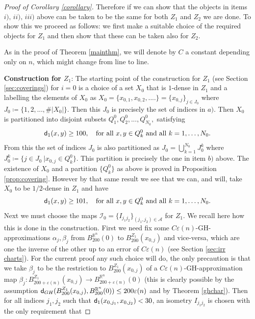 \documentclass[11pt]{article}
\newcommand{\eps}{\varepsilon}
\newcommand{\rr}{\mathbb{R}}
\newcommand{\sfd}{{\sf d}}
\theoremstyle{plain}
\theoremstyle{definition}
\numberwithin{equation}{section}
\begin{document}
\begin{proof}[Proof of Corollary \ref{corollary}]
Therefore if we can show that the objects in items $i),\,ii),\,iii)$ above can be taken to be the same for both $Z_1$ and $Z_2$ we are done. To show this we proceed as follows: we first make a suitable choice of the required objects for $Z_1$ and then show that these can be taken also for $Z_2.$

As in the proof of Theorem \ref{mainthm}, we will denote by $C$ a constant depending only on $n$, which might change from line to line. 

\textbf{Construction for $Z_1$}:
The starting point of the construction for $Z_1$ (see Section \ref{sec:coverings}) for $i=0$ is a choice of a set $X_0$ that is $1$-dense in $Z_1$ and a labelling the elements of $X_0$ as $X_0=\{x_{0,1},x_{0,2},....\}=\{x_{0,j}\}_{j\in J_0}$ where $J_0\coloneqq \{1,2,...,\#|X_0|\}$. Then this $J_0$ is precisely the set of indices in $a)$.
Then  $X_0$ is partitioned into disjoint subsets $Q^0_1,Q^0_2,...,Q^0_{N_0},$ satisfying 
\begin{equation}\label{eq:base}
    \sfd_1(x,y)\ge100, \quad \text{for all $x,y \in Q^0_k$ and all $k=1,\dots,N_0$}.
\end{equation}
From this the set of indices $J_0$ is also partitioned as $J_0=\bigcup_{k=1}^{N_0}J_0^k$ where $J_0^k\coloneqq  \{ j\in J_0 \ | x_{0,j}\in Q_k^0\}$. This partition is precisely the one in item $b)$ above.  The existence of $X_0$ and a partition $\{Q_k^0\}$ as above is proved in Proposition \ref{prop:covering}. However by that same result we see that we can, and will,  take $X_0$ to be $1/2$-dense in $Z_1$ and have
\begin{equation}\label{eq:improved}
    \sfd_1(x,y)\ge101, \quad \text{for all $x,y \in Q^0_k$ and all $k=1,\dots,N_0$}.
\end{equation}
Next we must choose the maps $\mathcal I_0=\{ I_{j_1j_2}\}_{(j_1,j_2)\in \mathcal A}$ for $Z_1$. We recall here how this is done in the construction. First we need fix some $C\eps(n)$-GH-approximations $\alpha_j,\beta_j$ from $B_{200}^{\rr^n}(0)$ to $B_{200}^{Z_1}(x_{0,j})$ and vice-versa, which are one the inverse of the other up to an error of $C\eps(n)$  (see Section \ref{sec:irr charts}). For the current proof   any such choice will do, the only precaution is that we take $\beta_j$ to be the restriction to $B_{200}^{Z_1}(x_{0,j})$ of a $C\eps(n)$-GH-approximation map  $\beta_j: B^{Z_1}_{200+\eps(n)}(x_{0,j})\to  B_{200+\eps(n)}^{\rr^n}(0)$ (this is clearly possible by the assumption $\sfd_{GH}(B^{Z_1}_{200}(x_{0,j}),B_{200}^{\rr^n}(0))\le 200\eps(n)$ and by Theorem \ref{ghchar}). Then for all indices $j_1,j_2$ such that $\sfd_1(x_{0,j_1},x_{0,j_2})<30$,  an isometry $I_{j_1j_2}$ is chosen with the only requirement that

\end{proof}
\end{document}
